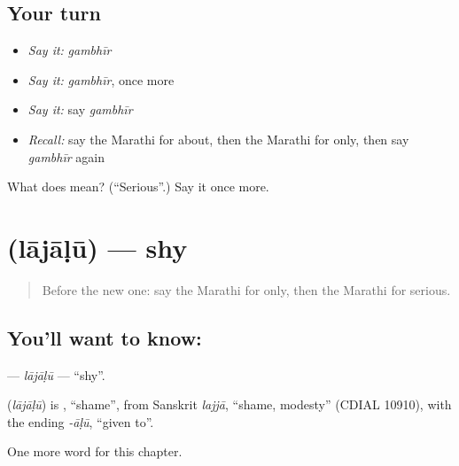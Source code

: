 \subsection*{Your turn}
\begin{itemize}
\raggedright
  \item \emph{Say it:} \emph{gambhīr}
  \item \emph{Say it:} \emph{gambhīr}, once more
  \item \emph{Say it:} say \emph{gambhīr}
  \item \emph{Recall:} say the Marathi for about, then the Marathi for only, then say \emph{gambhīr} again
\end{itemize}

\begin{tcolorbox}[breakable,colback=teal!4,colframe=teal!35!black,title={Before you move on}]
What does  mean? (\textquotedblleft{}Serious\textquotedblright{}.) Say it once more.
\end{tcolorbox}
\section[\texorpdfstring{\mr{लाजाळू} (lājāḷū)}{लाजाळू (lājāḷū)}]{ (lājāḷū) — shy}

\label{lesson:MR-C204-lajalu}



\begin{quote}
Before the new one: say the Marathi for only, then the Marathi for serious.
\end{quote}

\subsection*{You'll want to know: }
\textbf{} — \emph{lājāḷū} — \textquotedblleft{}shy\textquotedblright{}.

\begin{cousinweb}
\textbf{} (\emph{lājāḷū}) is \textbf{}, \textquotedblleft{}shame\textquotedblright{}, from Sanskrit \emph{lajjā}, \textquotedblleft{}shame, modesty\textquotedblright{} (CDIAL 10910), with the ending \emph{-āḷū}, \textquotedblleft{}given to\textquotedblright{}.
\end{cousinweb}

\begin{grammarlens}[title={What you've built}]
One more word for this chapter.
\end{grammarlens}

